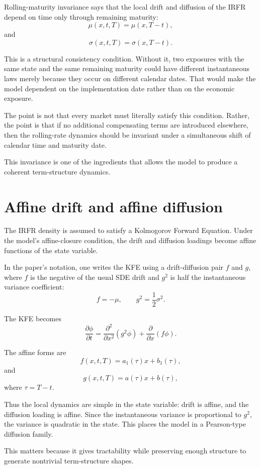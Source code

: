 \documentclass[11pt]{article}
\theoremstyle{plainbreak}
\begin{document}
Rolling-maturity invariance says that the local drift and diffusion of the IRFR depend on time only through remaining maturity:
\[
\mu(x,t,T)=\mu(x,T-t),
\]
and
\[
\sigma(x,t,T)=\sigma(x,T-t).
\]

This is a structural consistency condition. Without it, two exposures with the same state and the same remaining maturity could have different instantaneous laws merely because they occur on different calendar dates. That would make the model dependent on the implementation date rather than on the economic exposure.

The point is not that every market must literally satisfy this condition. Rather, the point is that if no additional compensating terms are introduced elsewhere, then the rolling-rate dynamics should be invariant under a simultaneous shift of calendar time and maturity date.

This invariance is one of the ingredients that allows the model to produce a coherent term-structure dynamics.

\section{Affine drift and affine diffusion}

The IRFR density is assumed to satisfy a Kolmogorov Forward Equation. Under the model's affine-closure condition, the drift and diffusion loadings become affine functions of the state variable.

In the paper's notation, one writes the KFE using a drift-diffusion pair \(f\) and \(g\), where \(f\) is the negative of the usual SDE drift and \(g^2\) is half the instantaneous variance coefficient:
\[
f=-\mu, \qquad g^2=\frac{1}{2}\sigma^2.
\]

The KFE becomes
\[
\frac{\partial \phi}{\partial t}
=
\frac{\partial^2}{\partial x^2}(g^2\phi)
+
\frac{\partial}{\partial x}(f\phi).
\]

The affine forms are
\[
f(x,t,T)=a_1(\tau)x+b_1(\tau),
\]
and
\[
g(x,t,T)=a(\tau)x+b(\tau),
\]
where \(\tau=T-t\).

Thus the local dynamics are simple in the state variable: drift is affine, and the diffusion loading is affine. Since the instantaneous variance is proportional to \(g^2\), the variance is quadratic in the state. This places the model in a Pearson-type diffusion family.

This matters because it gives tractability while preserving enough structure to generate nontrivial term-structure shapes.
\end{document}
